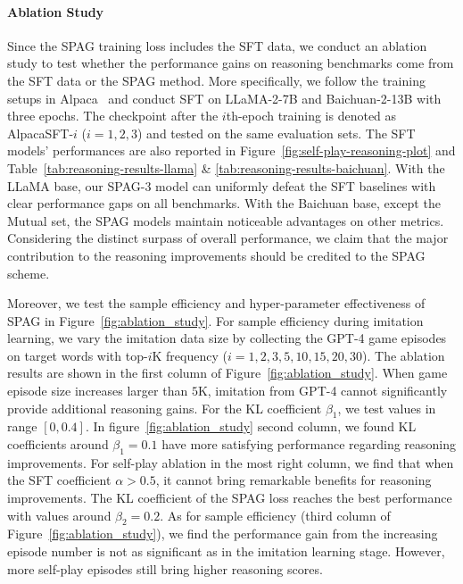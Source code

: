 \documentclass{article}
\theoremstyle{plain}
\theoremstyle{definition}
\theoremstyle{remark}
\begin{document}
\paragraph{Ablation Study} Since the SPAG training loss includes the SFT data, we conduct an ablation study to test whether the performance gains on reasoning benchmarks come from the SFT data or the SPAG method. More specifically, we follow the training setups in Alpaca~\citep{alpaca} and conduct SFT on LLaMA-2-7B and Baichuan-2-13B with three epochs. The checkpoint after the $i$th-epoch training is denoted as AlpacaSFT-$i$ ($i=1,2,3$) and tested on the same evaluation sets. The SFT models' performances are also reported in Figure~\ref{fig:self-play-reasoning-plot} and Table~\ref{tab:reasoning-results-llama} \& \ref{tab:reasoning-results-baichuan}. With the LLaMA base, our SPAG-3 model can uniformly defeat the SFT baselines with clear performance gaps on all benchmarks. With the Baichuan base, except the Mutual set, the SPAG models maintain noticeable advantages on other metrics. Considering the distinct surpass of overall performance, we claim that the major contribution to the reasoning improvements should be credited to the SPAG scheme. 

Moreover, we test the sample efficiency and hyper-parameter effectiveness of SPAG in Figure~\ref{fig:ablation_study}. For sample efficiency during imitation learning, we vary the imitation data size by collecting the GPT-4 game episodes on target words with top-$i$K frequency ($i=1,2,3,5,10,15,20,30$). The ablation results are shown in the first column of Figure~\ref{fig:ablation_study}. When game episode size increases larger than $5$K, imitation from GPT-4 cannot significantly provide additional reasoning gains. For the KL coefficient $\beta_1$, we test values in range $[0,0.4]$. In figure~\ref{fig:ablation_study} second column, we found KL coefficients around $\beta_1=0.1$ have more satisfying performance regarding reasoning improvements.
For self-play ablation in the most right column, we find that when the SFT coefficient $\alpha>0.5$, it cannot bring remarkable benefits for reasoning improvements. The KL coefficient of the SPAG loss reaches the best performance with values around $\beta_2=0.2$. As for sample efficiency (third column of Figure~\ref{fig:ablation_study}),  we find the performance gain from the increasing episode number is not as significant as in the imitation learning stage. However, more self-play episodes still bring higher reasoning scores.
\end{document}
